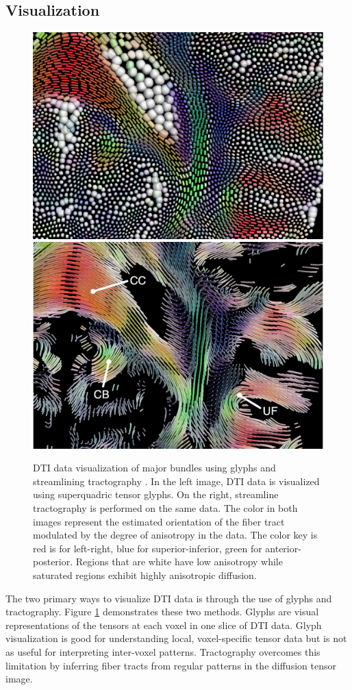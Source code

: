 
\subsection{Visualization}
\begin{figure} \label{fig:visualization}
	\includegraphics[width=0.5\linewidth]{packedglyphs}
	\includegraphics[width=0.5\linewidth]{tractography}
	\caption{DTI data visualization of major bundles using glyphs and streamlining tractography \cite{KindlmannTVCG2006}.  In the left image, DTI data is visualized using superquadric tensor glyphs. On the right, streamline tractography is performed on the same data.  The color in both images represent the estimated orientation of the fiber tract modulated by the degree of anisotropy in the data.  The color key is red is for left-right, blue for superior-inferior, green for anterior-posterior.  Regions that are white have low anisotropy while saturated regions exhibit highly anisotropic diffusion.}
\end{figure}


The two primary ways to visualize DTI data is through the use of glyphs and tractography.  Figure \ref{fig:visualization} demonstrates these two methods.  Glyphs are visual representations of the tensors at each voxel in one slice of DTI data.  Glyph visualization is good for understanding local, voxel-specific tensor data but is not as useful for interpreting inter-voxel patterns.  Tractography overcomes this limitation by inferring fiber tracts from regular patterns in the diffusion tensor image.

